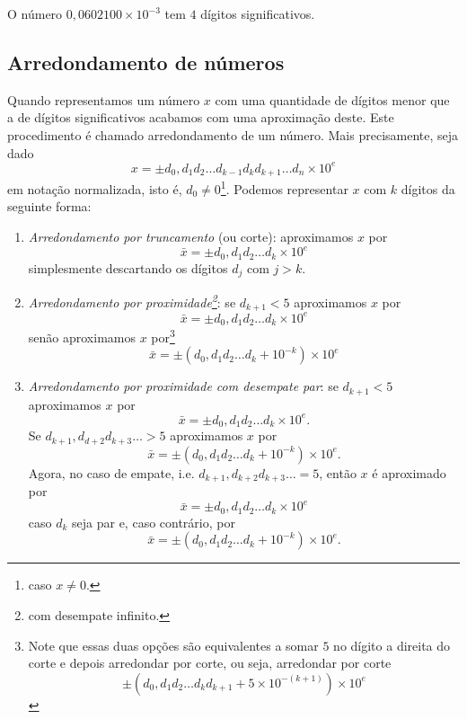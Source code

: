 \begin{ex} O número $0,0602100\times 10^{-3}$ tem $4$ dígitos significativos.
\end{ex}

\subsection{Arredondamento de números}

Quando representamos um número $x$ com uma quantidade de dígitos menor que a de dígitos significativos acabamos com uma aproximação deste. Este procedimento é chamado arredondamento de um número. Mais precisamente, seja dado
\begin{equation}
  x = \pm d_0,d_1d_2\ldots d_{k-1}d_kd_{k+1}\ldots d_n \times 10^e
\end{equation}
em notação normalizada, isto é, $d_0\neq 0$\footnote{caso $x\neq 0$.}. Podemos representar $x$ com $k$ dígitos da seguinte forma:
\begin{enumerate}
\item \emph{Arredondamento por truncamento} (ou corte): aproximamos $x$ por
$$
  \bar{x} = \pm d_{0},d_{1}d_{2}\ldots d_{k}\times 10^e
$$
simplesmente descartando os dígitos $d_{j}$ com $j > k$.
\item \emph{Arredondamento por proximidade\footnote{com desempate infinito.}}: se $d_{k+1}<5$ aproximamos $x$ por
$$
  \bar{x} = \pm d_0,d_1d_2\ldots d_{k}\times 10^{e}
$$
senão aproximamos $x$ por\footnote{Note que essas duas opções são equivalentes a somar $5$ no dígito a direita do corte e depois arredondar por corte, ou seja, arredondar por corte
\begin{equation}  \pm(d_0,d_1d_2\ldots d_kd_{k+1}+ 5 \times10^{-(k+1)} )\times 10^{e}  \end{equation}}
$$
 \bar{x} = \pm (d_0,d_1d_2\ldots d_{k} + 10^{-k}) \times 10^{e}
$$
\item \emph{Arredondamento por proximidade com desempate par}: se $d_{k+1}<5$ aproximamos $x$ por
$$
  \bar{x} = \pm d_0,d_1d_2\ldots d_{k}\times 10^{e}.
$$
Se $d_{k+1},d_{d+2}d_{k+3}\ldots>5$ aproximamos $x$ por
$$
 \bar{x} = \pm (d_0,d_1d_2\ldots d_{k} + 10^{-k}) \times 10^{e}.
$$
Agora, no caso de empate, i.e. $d_{k+1},d_{k+2}d_{k+3}\ldots = 5$, então $x$ é aproximado por
$$
  \bar{x} = \pm d_0,d_1d_2\ldots d_{k}\times 10^{e}
$$
caso $d_{k}$ seja par e, caso contrário, por
$$
 \bar{x} = \pm (d_0,d_1d_2\ldots d_{k} + 10^{-k}) \times 10^{e}.
$$
\end{enumerate}

